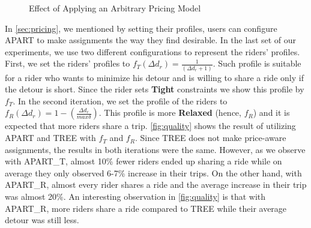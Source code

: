 \begin{figure}[h]
	\centering
    \vspace{-0.15in}
    \caption{Effect of Applying an Arbitrary Pricing Model}
    \vspace{-2mm}
    \label{fig:tkde}
\end{figure}

In \cref{sec:pricing}, we mentioned by setting their profiles, users can configure APART to make assignments the way they find desirable. In the last set of our experiments, we use two different configurations to represent the riders' profiles. First, we set the riders' profiles to $f_T(\Delta d_r) = \frac{1}{(\Delta d_r + 1)}$. Such profile is suitable for a rider who wants to minimize his detour and is willing to share a ride only if the detour is short. Since the rider sets \textbf{Tight} constraints we show this profile by $f_T$. In the second iteration, we set the profile of the riders to $f_R(\Delta d_r) = 1 -  (\frac{\Delta d_r}{max \delta})$. This profile is more \textbf{Relaxed} (hence, $f_R$) and it is expected that more riders share a trip. \cref{fig:quality} shows the result of utilizing APART and TREE with $f_T$ and $f_R$. Since TREE does not make price-aware assignments, the results in both iterations were the same. However, as we observe with APART\_T, almost 10\% fewer riders ended up sharing a ride while on average they only observed 6-7\% increase in their trips. On the other hand, with APART\_R, almost every rider shares a ride and the average increase in their trip was almost 20\%. An interesting observation in \cref{fig:quality} is that with APART\_R, more riders share a ride compared to TREE while their average detour was still less.


